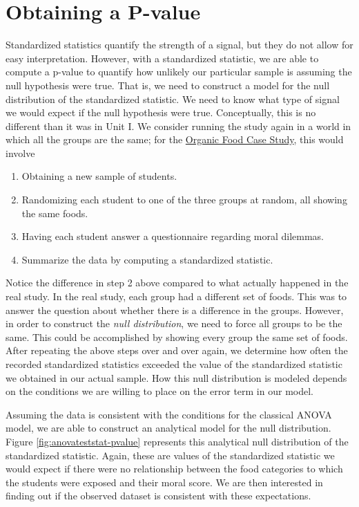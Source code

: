 \documentclass[]{book}
\providecommand{\tightlist}{%
  \setlength{\itemsep}{0pt}\setlength{\parskip}{0pt}}
\theoremstyle{plain}
\theoremstyle{mydefn}
\theoremstyle{myexmpl}
\theoremstyle{remark}
\begin{document}
\section{Obtaining a P-value}\label{obtaining-a-p-value}

Standardized statistics quantify the strength of a signal, but they do
not allow for easy interpretation. However, with a standardized
statistic, we are able to compute a p-value to quantify how unlikely our
particular sample is assuming the null hypothesis were true. That is, we
need to construct a model for the null distribution of the standardized
statistic. We need to know what type of signal we would expect if the
null hypothesis were true. Conceptually, this is no different than it
was in Unit I. We consider running the study again in a world in which
all the groups are the same; for the
\protect\hyperlink{CaseOrganic}{Organic Food Case Study}, this would
involve

\begin{enumerate}
\def\labelenumi{\arabic{enumi}.}
\tightlist
\item
  Obtaining a new sample of students.\\
\item
  Randomizing each student to one of the three groups at random, all
  showing the same foods.\\
\item
  Having each student answer a questionnaire regarding moral dilemmas.
\item
  Summarize the data by computing a standardized statistic.
\end{enumerate}

Notice the difference in step 2 above compared to what actually happened
in the real study. In the real study, each group had a different set of
foods. This was to answer the question about whether there is a
difference in the groups. However, in order to construct the \emph{null
distribution}, we need to force all groups to be the same. This could be
accomplished by showing every group the same set of foods. After
repeating the above steps over and over again, we determine how often
the recorded standardized statistics exceeded the value of the
standardized statistic we obtained in our actual sample. How this null
distribution is modeled depends on the conditions we are willing to
place on the error term in our model.

Assuming the data is consistent with the conditions for the classical
ANOVA model, we are able to construct an analytical model for the null
distribution. Figure \ref{fig:anovateststat-pvalue} represents this
analytical null distribution of the standardized statistic. Again, these
are values of the standardized statistic we would expect if there were
no relationship between the food categories to which the students were
exposed and their moral score. We are then interested in finding out if
the observed dataset is consistent with these expectations.
\end{document}

